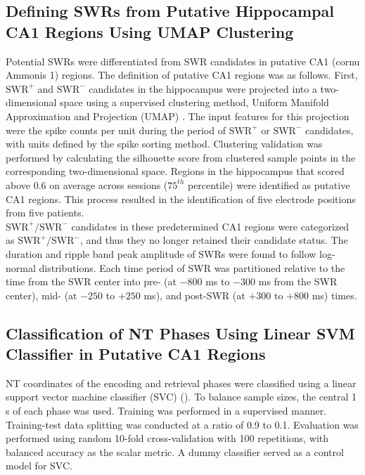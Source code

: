 \documentclass[preprint,review,12pt]{elsarticle}%
\begin{document}
\subsection{Defining SWRs from Putative Hippocampal CA1 Regions Using UMAP Clustering}
Potential SWRs were differentiated from SWR candidates in putative CA1 (cornu Ammonis 1) regions. The definition of putative CA1 regions was as follows. First, $\textrm{SWR}^+$ and $\textrm{SWR}^-$ candidates in the hippocampus were projected into a two-dimensional space using a supervised clustering method, Uniform Manifold Approximation and Projection (UMAP) \cite{mcinnes_umap_2018}. The input features for this projection were the spike counts per unit during the period of $\textrm{SWR}^+$ or $\textrm{SWR}^-$ candidates, with units defined by the spike sorting method. Clustering validation was performed by calculating the silhouette score \cite{rousseeuw_silhouettes_1987} from clustered sample points in the corresponding two-dimensional space. Regions in the hippocampus that scored above 0.6 on average across sessions ($75^{th}$ percentile) were identified as putative CA1 regions. This process resulted in the identification of five electrode positions from five patients.
\\
\indent
$\textrm{SWR}^+/\textrm{SWR}^-$ candidates in these predetermined CA1 regions were categorized as $\textrm{SWR}^+/\textrm{SWR}^-$, and thus they no longer retained their candidate status. The duration and ripple band peak amplitude of SWRs were found to follow log-normal distributions. Each time period of SWR was partitioned relative to the time from the SWR center into pre- (at $-800$ ms to $-300$ ms from the SWR center), mid- (at $-250$ to $+250$ ms), and post-SWR (at $+300$ to $+800$ ms) times.
\\
\indent
\subsection{Classification of NT Phases Using Linear SVM Classifier in Putative CA1 Regions}
NT coordinates of the encoding and retrieval phases were classified using a linear support vector machine classifier (SVC) (\cite{10.5555/1953048.2078195}). To balance sample sizes, the central 1 s of each phase was used. Training was performed in a supervised manner. Training-test data splitting was conducted at a ratio of 0.9 to 0.1. Evaluation was performed using random 10-fold cross-validation with 100 repetitions, with balanced accuracy as the scalar metric. A dummy classifier served as a control model for SVC.
\\
\indent
\end{document}
